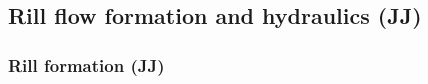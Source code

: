         \subsection{Rill flow formation and hydraulics (JJ)}


        \subsubsection{Rill formation (JJ)}

